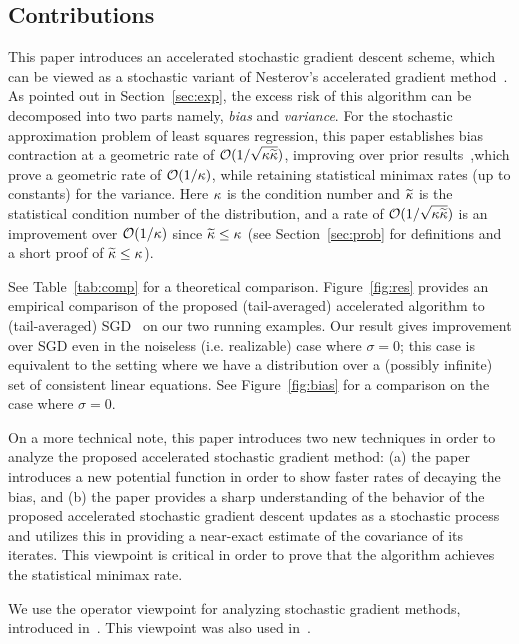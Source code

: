 \subsection{Contributions}\label{sec:res}
This paper introduces an accelerated stochastic gradient descent
scheme, which can be viewed as a stochastic variant of Nesterov's accelerated gradient method~\citep{Nesterov12}. As pointed out in Section~\ref{sec:exp}, the excess risk of this algorithm can be decomposed into two parts namely, \emph{bias} and \emph{variance}. For the stochastic approximation problem of least squares regression, this paper establishes bias contraction at a geometric rate of $\mathcal{O}(1/\sqrt{{\kappa}\widetilde{\kappa}})$, improving over prior results~\citep{FrostigGKS15,JainKKNS16},which prove a geometric rate of $\mathcal{O}(1/{\kappa})$, while retaining statistical minimax rates (up to constants) for the variance. Here ${\kappa}$ is the condition number and $\widetilde{\kappa}$ is the statistical condition number of the distribution, and a rate of $\mathcal{O}(1/\sqrt{{\kappa}\widetilde{\kappa}})$ is an improvement over $\mathcal{O}(1/{\kappa})$ since $\widetilde{\kappa} \leq {\kappa}$ (see Section~\ref{sec:prob} for definitions and a short proof of $\widetilde{\kappa} \leq {\kappa}$).

See Table~\ref{tab:comp} for a theoretical comparison. Figure~\ref{fig:res} provides an empirical comparison of the proposed (tail-averaged) accelerated algorithm to (tail-averaged) SGD~\citep{JainKKNS16} on our two running examples. Our result gives improvement over SGD even in the noiseless (i.e. realizable) case where $\sigma=0$; this case is equivalent to the setting where we have a distribution over a (possibly infinite) set of consistent linear equations. See Figure~\ref{fig:bias} for a comparison
on the case where $\sigma=0$.


On a more technical note, this paper introduces two new techniques in
order to analyze the proposed accelerated stochastic gradient method:
(a) the paper introduces a new potential function in order to
show faster rates of decaying the bias, and (b) the paper
provides a sharp understanding of the behavior of the
proposed accelerated stochastic gradient descent updates as a
stochastic process and utilizes this in providing a near-exact
estimate of the covariance of its iterates. This
viewpoint is critical in order to prove that the algorithm
achieves the statistical minimax rate. 

We use the operator viewpoint for analyzing stochastic
gradient methods, introduced in~\cite{DefossezB15}. This
viewpoint was also used in~\cite{DieuleveutB15,JainKKNS16}.
